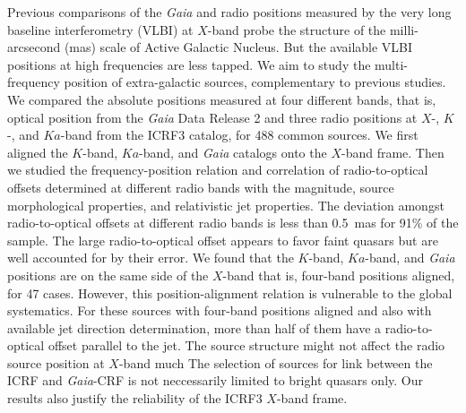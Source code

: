 \documentclass{aa}
\begin{document}
  \abstract
   {
       Previous comparisons of the \textit{Gaia} and radio positions measured by the very long baseline interferometry (VLBI) at $X$-band probe the structure of the milli-arcsecond (mas) scale of Active Galactic Nucleus.
       But the available VLBI positions at high frequencies are less tapped.
   }
   {
       We aim to study the multi-frequency position of extra-galactic sources, complementary to previous studies.}
   {
       We compared the absolute positions measured at four different bands,
       that is, optical position from the {\it Gaia} Data Release 2 and three radio positions at $X$-, $K$-, and $Ka$-band from the ICRF3 catalog, for 488 common sources.
       We first aligned the $K$-band, $Ka$-band, and \textit{Gaia} catalogs onto the $X$-band frame.
       Then we studied the frequency-position relation and correlation of radio-to-optical offsets determined at different radio bands
       with the magnitude, source morphological properties, and relativistic jet properties.
   }
   {
       The deviation amongst radio-to-optical offsets at different radio bands is less than 0.5~mas for 91\% of the sample.
       The large radio-to-optical offset appears to favor faint quasars but are well accounted for by their error.
       We found that the $K$-band, $Ka$-band, and \textit{Gaia} positions are on the same side of the $X$-band that is, four-band positions aligned, for 47 cases.
       However, this position-alignment relation is vulnerable to the global systematics.
       For these sources with four-band positions aligned and also with available jet direction determination, more than half of them have a radio-to-optical offset parallel to the jet.
   }
   {
       The source structure might not affect the radio source position at $X$-band much
       The selection of sources for link between the ICRF and \textit{Gaia}-CRF is not neccessarily limited to bright quasars only.
       Our results also justify the reliability of the ICRF3 $X$-band frame.
   }
\end{document}
